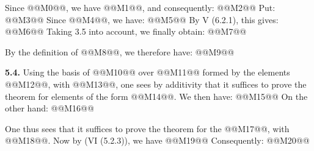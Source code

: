 Since @@M0@@, we have @@M1@@, and consequently:
@@M2@@
Put:
@@M3@@
Since @@M4@@, we have:
@@M5@@
By V (6.2.1), this gives:
@@M6@@
Taking 3.5 into account, we finally obtain:
@@M7@@

By the definition of @@M8@@, we therefore have:
@@M9@@

\textbf{5.4.} Using the basis of @@M10@@ over @@M11@@ formed by the elements @@M12@@, with @@M13@@, one sees by additivity that it suffices to prove the theorem for elements of the form @@M14@@. We then have:
@@M15@@
On the other hand:
@@M16@@

One thus sees that it suffices to prove the theorem for the @@M17@@, with @@M18@@. Now by (VI (5.2.3)), we have
@@M19@@
Consequently:
@@M20@@
